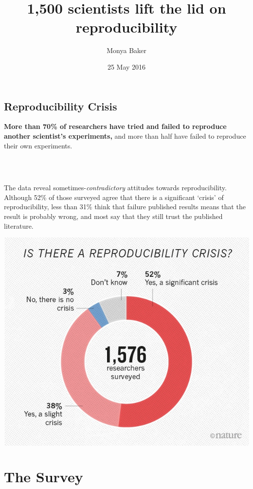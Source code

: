 \documentclass[
]{article}
\title{1,500 scientists lift the lid on reproducibility}
\author{Monya Baker}
\date{25 May 2016}
\begin{document}
\maketitle

{
\setcounter{tocdepth}{4}
\tableofcontents
}
\subsection{Reproducibility Crisis}\label{reproducibility-crisis}

\textbf{More than 70\% of researchers have tried and failed to reproduce
another scientist's experiments,} and more than half have failed to
reproduce their own experiments.\\
\strut \\
\strut \\
The data reveal sometimes-\emph{contradictory} attitudes towards
reproducibility. Although 52\% of those surveyed agree that there is a
significant `crisis' of reproducibility, less than 31\% think that
failure published results means that the result is probably wrong, and
most say that they still trust the published literature.

\includegraphics{reproducibility-graphic-online1.jpeg}\\

\section{The Survey}\label{the-survey}
\end{document}
